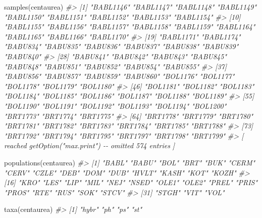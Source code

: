 \documentclass[
  11pt,
  a4paper]{article}
\newenvironment{Shaded}{\begin{snugshade}}{\end{snugshade}}
\newcommand{\CommentTok}[1]{\textcolor[rgb]{0.56,0.35,0.01}{\textit{#1}}}
\newcommand{\FunctionTok}[1]{\textcolor[rgb]{0.00,0.00,0.00}{#1}}
\newcommand{\NormalTok}[1]{#1}
\begin{document}
\begin{Shaded}
\begin{Highlighting}[]
\FunctionTok{samples}\NormalTok{(centaurea)}
\CommentTok{\#\textgreater{}  [1] "BABL1146" "BABL1147" "BABL1148" "BABL1149" "BABL1150" "BABL1151" "BABL1152" "BABL1153" "BABL1154"}
\CommentTok{\#\textgreater{} [10] "BABL1155" "BABL1156" "BABL1157" "BABL1158" "BABL1159" "BABL1164" "BABL1165" "BABL1166" "BABL1170"}
\CommentTok{\#\textgreater{} [19] "BABL1171" "BABL1174" "BABU834"  "BABU835"  "BABU836"  "BABU837"  "BABU838"  "BABU839"  "BABU840" }
\CommentTok{\#\textgreater{} [28] "BABU841"  "BABU842"  "BABU843"  "BABU845"  "BABU848"  "BABU851"  "BABU852"  "BABU854"  "BABU855" }
\CommentTok{\#\textgreater{} [37] "BABU856"  "BABU857"  "BABU859"  "BABU860"  "BOL1176"  "BOL1177"  "BOL1178"  "BOL1179"  "BOL1180" }
\CommentTok{\#\textgreater{} [46] "BOL1181"  "BOL1182"  "BOL1183"  "BOL1184"  "BOL1185"  "BOL1186"  "BOL1187"  "BOL1188"  "BOL1189" }
\CommentTok{\#\textgreater{} [55] "BOL1190"  "BOL1191"  "BOL1192"  "BOL1193"  "BOL1194"  "BOL1200"  "BRT1773"  "BRT1774"  "BRT1775" }
\CommentTok{\#\textgreater{} [64] "BRT1778"  "BRT1779"  "BRT1780"  "BRT1781"  "BRT1782"  "BRT1783"  "BRT1784"  "BRT1785"  "BRT1788" }
\CommentTok{\#\textgreater{} [73] "BRT1792"  "BRT1794"  "BRT1795"  "BRT1797"  "BRT1798"  "BRT1799" }
\CommentTok{\#\textgreater{}  [ reached getOption("max.print") {-}{-} omitted 574 entries ]}
\end{Highlighting}
\end{Shaded}

\vspace{-0.4cm}

\begin{Shaded}
\begin{Highlighting}[]
\FunctionTok{populations}\NormalTok{(centaurea)}
\CommentTok{\#\textgreater{}  [1] "BABL" "BABU" "BOL"  "BRT"  "BUK"  "CERM" "CERV" "CZLE" "DEB"  "DOM"  "DUB"  "HVLT" "KASH" "KOT"  "KOZH"}
\CommentTok{\#\textgreater{} [16] "KRO"  "LES"  "LIP"  "MIL"  "NEJ"  "NSED" "OLE1" "OLE2" "PREL" "PRIS" "PROS" "RTE"  "RUS"  "SOK"  "STCV"}
\CommentTok{\#\textgreater{} [31] "STGH" "VIT"  "VOL"}
\end{Highlighting}
\end{Shaded}

\vspace{-0.4cm}

\begin{Shaded}
\begin{Highlighting}[]
\FunctionTok{taxa}\NormalTok{(centaurea)}
\CommentTok{\#\textgreater{} [1] "hybr" "ph"   "ps"   "st"}
\end{Highlighting}
\end{Shaded}
\end{document}
